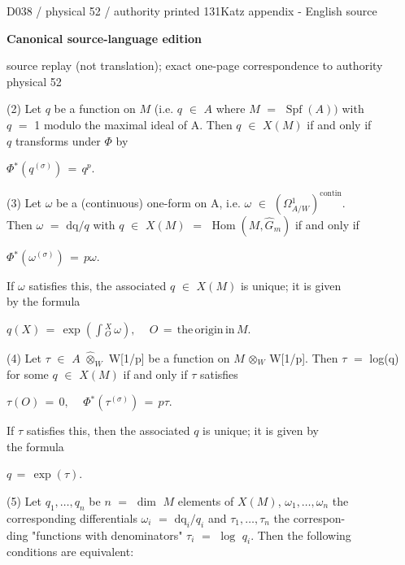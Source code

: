 \documentclass[9pt]{article}
\newcommand{\CanonText}[1]{\par{\fontsize{8.0}{9.35}\selectfont\RaggedRight #1\par}\vspace{2.2pt}}
\newcommand{\CanonDisplay}[1]{\par\vspace{1.2pt}\begin{center}{\fontsize{7.2}{8.4}\selectfont\(\displaystyle #1\)}\end{center}\vspace{1.2pt}}
\newcommand{\LayerTitle}{Canonical source-language edition}
\begin{document}
\noindent\begin{minipage}[t][\dimexpr\textheight-5pt\relax][t]{\textwidth}
{\sffamily\fontsize{7.3}{8.2}\selectfont\color{Quiet} D038 / physical 52 / authority printed 131\hfill Katz appendix - English source}
\par{}\vspace{4.5pt}
{\sffamily\fontsize{10.4}{11.6}\selectfont\bfseries\color{Accent} \LayerTitle}
\par{\sffamily\fontsize{6.7}{7.7}\selectfont\color{Quiet} source replay (not translation); exact one-page correspondence to authority physical 52}
\vspace{5pt}
\CanonText{(2) Let \(q\) be a function on \(M\) (i.e. \(q\) \(\in{}\) \(A\) where \(M\) \(=\) \(\operatorname{Spf}(A))\) with\\\(q\) \(=\) 1 modulo the maximal ideal of A. Then \(q\) \(\in{}\) \(X(M)\) if and only if\\\(q\) transforms under \(\Phi{}\) by}
\CanonDisplay{\Phi{}^{*}(q^{(\sigma{})})\,=\,q^{p}.}
\CanonText{(3) Let \(\omega{}\) be a (continuous) one-form on A, i.e. \(\omega{}\) \(\in{}\) \((\Omega{}^{1}_{A/W})^{\mathrm{contin}}\).\\Then \(\omega{}\) \(=\) \(\text{dq}/q\) with \(q\) \(\in{}\) \(X(M)\) \(=\) \(\operatorname{Hom}(M,\widehat{G}_{m})\) if and only if}
\CanonDisplay{\Phi{}^{*}(\omega{}^{(\sigma{})})\,=\,p\omega{}.}
\CanonText{If \(\omega{}\) satisfies this, the associated \(q\) \(\in{}\) \(X(M)\) is unique; it is given\\by the formula}
\CanonDisplay{q(X)\,=\,\operatorname{exp}(\int{}_{O}^{X}\,\omega{}),\quad\,O\,=\,\text{the}\,\text{origin}\,\text{in}\,M.}
\CanonText{(4) Let \(\tau{}\) \(\in{}\) \(A\) \(\widehat{\otimes}_{W}\) W[1/p] be a function on \(M\) \(\otimes{}_{W}\) W[1/p]. Then \(\tau{}\) \(=\) log(q)\\for some \(q\) \(\in{}\) \(X(M)\) if and only if \(\tau{}\) satisfies}
\CanonDisplay{\tau{}(O)\,=\,0,\quad\,\Phi{}^{*}(\tau{}^{(\sigma{})})\,=\,p\tau{}.}
\CanonText{If \(\tau{}\) satisfies this, then the associated \(q\) is unique; it is given by\\the formula}
\CanonDisplay{q\,=\,\operatorname{exp}(\tau{}).}
\CanonText{(5) Let \(q_{1},\ldots{},q_{n}\) be \(n\) \(=\) \(\operatorname{dim}\) \(M\) elements of \(X(M)\), \(\omega{}_{1},\ldots{},\omega{}_{n}\) the\\corresponding differentials \(\omega{}_{i}\) \(=\) \(\text{dq}_{i}/q_{i}\) and \(\tau{}_{1},\ldots{},\tau{}_{n}\) the correspon-\\ding "functions with denominators" \(\tau{}_{i}\) \(=\) \(\operatorname{log}\) \(q_{i}\). Then the following\\conditions are equivalent:}

\end{minipage}
\end{document}

